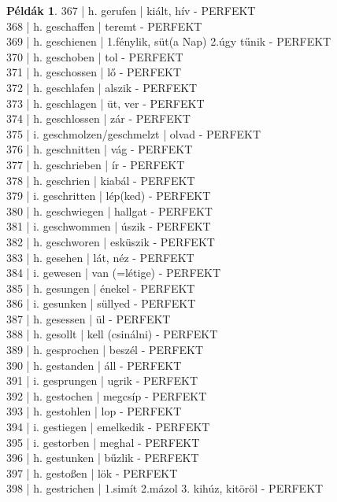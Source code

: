 \documentclass{article}
\theoremstyle{definition}
\newtheorem*{exmp}{Példák}
\begin{document}
\begin{exmp}
367 | h. gerufen | kiált, hív - PERFEKT\\
368 | h. geschaffen | teremt - PERFEKT\\
369 | h. geschienen | 1.fénylik, süt(a Nap) 2.úgy tűnik - PERFEKT\\
370 | h. geschoben | tol - PERFEKT\\
371 | h. geschossen | lő - PERFEKT\\
372 | h. geschlafen | alszik - PERFEKT\\
373 | h. geschlagen | üt, ver - PERFEKT\\
374 | h. geschlossen | zár - PERFEKT\\
375 | i. geschmolzen/geschmelzt | olvad - PERFEKT\\
376 | h. geschnitten | vág - PERFEKT\\
377 | h. geschrieben | ír - PERFEKT\\
378 | h. geschrien | kiabál - PERFEKT\\
379 | i. geschritten | lép(ked) - PERFEKT\\
380 | h. geschwiegen | hallgat - PERFEKT\\
381 | i. geschwommen | úszik - PERFEKT\\
382 | h. geschworen | esküszik - PERFEKT\\
383 | h. gesehen | lát, néz - PERFEKT\\
384 | i. gewesen | van (=létige) - PERFEKT\\
385 | h. gesungen | énekel - PERFEKT\\
386 | i. gesunken | süllyed - PERFEKT\\
387 | h. gesessen | ül - PERFEKT\\
388 | h. gesollt | kell (csinálni) - PERFEKT\\
389 | h. gesprochen | beszél - PERFEKT\\
390 | h. gestanden | áll - PERFEKT\\
391 | i. gesprungen | ugrik - PERFEKT\\
392 | h. gestochen | megcsíp - PERFEKT\\
393 | h. gestohlen | lop - PERFEKT\\
394 | i. gestiegen | emelkedik - PERFEKT\\
395 | i. gestorben | meghal - PERFEKT\\
396 | h. gestunken | bűzlik - PERFEKT\\
397 | h. gestoßen | lök - PERFEKT\\
398 | h. gestrichen | 1.simít 2.mázol 3. kihúz, kitöröl - PERFEKT\\

\end{exmp}
\end{document}
